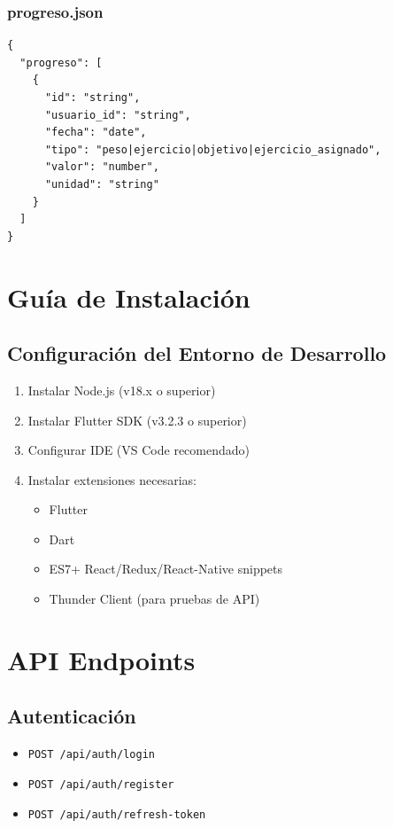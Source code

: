 \documentclass[12pt,a4paper]{article}
\begin{document}
\subsubsection{progreso.json}
\begin{verbatim}
{
  "progreso": [
    {
      "id": "string",
      "usuario_id": "string",
      "fecha": "date",
      "tipo": "peso|ejercicio|objetivo|ejercicio_asignado",
      "valor": "number",
      "unidad": "string"
    }
  ]
}
\end{verbatim}

\section{Guía de Instalación}

\subsection{Configuración del Entorno de Desarrollo}
\begin{enumerate}
    \item Instalar Node.js (v18.x o superior)
    \item Instalar Flutter SDK (v3.2.3 o superior)
    \item Configurar IDE (VS Code recomendado)
    \item Instalar extensiones necesarias:
        \begin{itemize}
            \item Flutter
            \item Dart
            \item ES7+ React/Redux/React-Native snippets
            \item Thunder Client (para pruebas de API)
        \end{itemize}
\end{enumerate}

\section{API Endpoints}

\subsection{Autenticación}
\begin{itemize}
    \item \texttt{POST /api/auth/login}
    \item \texttt{POST /api/auth/register}
    \item \texttt{POST /api/auth/refresh-token}
\end{itemize}
\end{document}
